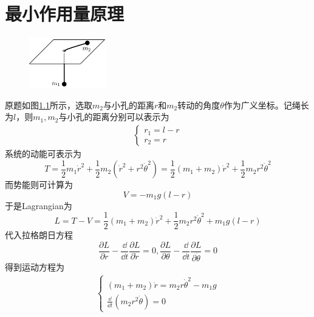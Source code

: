 \chapter{最小作用量原理}


\begin{solution}
	\begin{figure}[h]
		\centering
		\includegraphics[width=0.3\textwidth]{content/Figures/2-2}
		\caption{ }
		\label{fig:4-1}
	\end{figure}
    原题如图\ref{fig:4-1}所示，选取\(m_2\)与小孔的距离\(r\)和\(m_2\)转动的角度\(\theta\)作为广义坐标。记绳长为\(l\)，则\(m_1,m_2\)与小孔的距离分别可以表示为
    \begin{align*}
    	\begin{cases}
    		r_1=l-r\\
    		r_2=r
    	\end{cases}
    \end{align*}
    系统的动能可表示为
    \[T=\frac{1}{2}m_1 \dot{r}^2+\frac{1}{2}m_2(\dot{r}^2+r^2 \dot{\theta}^2)=\frac{1}{2}(m_1+m_2)\dot{r}^2+\frac{1}{2}m_2 r^2\dot{\theta}^2\]
    而势能则可计算为
    \[V=-m_1 g(l-r)\]
    于是Lagrangian为
    \[L=T-V=\frac{1}{2}(m_1+m_2)\dot{r}^2+\frac{1}{2}m_2 r^2\dot{\theta}^2+m_1 g(l-r)\]
    代入拉格朗日方程
    \[\frac{\partial L}{\partial r}-\frac{\dd }{\dd t}\frac{\partial L}{\partial \dot{r}}=0,\frac{\partial L}{\partial \theta}-\frac{\dd }{\dd t}\frac{\partial L}{\partial \dot{\theta}}=0\]
    得到运动方程为
    \begin{align*}
    	\begin{cases}
    		(m_1+m_2)\ddot{r}=m_2 r\dot{\theta}^2-m_1 g\\
    		\frac{\dd}{\dd t}(m_2 r^2 \dot{\theta})=0
    	\end{cases}
    \end{align*}
\end{solution}

